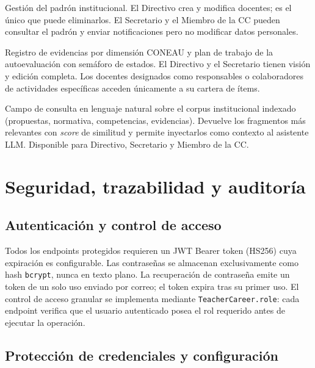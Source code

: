 \begin{description}[noitemsep, leftmargin=0pt]
  \item[\textbf{Docentes}]
    Gestión del padrón institucional.
    El Directivo crea y modifica docentes; es el único que puede
    eliminarlos.
    El Secretario y el Miembro de la CC pueden consultar el padrón y
    enviar notificaciones pero no modificar datos personales.

  \item[\textbf{Acreditación}]
    Registro de evidencias por dimensión CONEAU y plan de trabajo de la
    autoevaluación con semáforo de estados.
    El Directivo y el Secretario tienen visión y edición completa.
    Los docentes designados como responsables o colaboradores de
    actividades específicas acceden únicamente a su cartera de ítems.

  \item[\textbf{Búsqueda semántica}]
    Campo de consulta en lenguaje natural sobre el corpus institucional
    indexado (propuestas, normativa, competencias, evidencias).
    Devuelve los fragmentos más relevantes con \emph{score} de similitud
    y permite inyectarlos como contexto al asistente LLM.
    Disponible para Directivo, Secretario y Miembro de la CC.
\end{description}

\section{Seguridad, trazabilidad y auditoría}
\label{sec:seguridad}

\subsection{Autenticación y control de acceso}
\label{subsec:seg_auth}

Todos los endpoints protegidos requieren un JWT Bearer token (HS256)
cuya expiración es configurable.
Las contraseñas se almacenan exclusivamente como hash \texttt{bcrypt},
nunca en texto plano.
La recuperación de contraseña emite un token de un solo uso enviado
por correo; el token expira tras su primer uso.
El control de acceso granular se implementa mediante
\texttt{TeacherCareer.role}: cada endpoint verifica que el usuario
autenticado posea el rol requerido antes de ejecutar la operación.

\subsection{Protección de credenciales y configuración}
\label{subsec:seg_creds}


